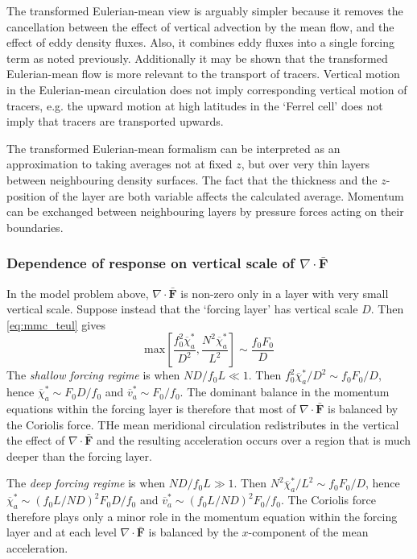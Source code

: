 \documentclass{jknotes}
\begin{document}
The transformed Eulerian-mean view is arguably simpler because it removes the
cancellation between the effect of vertical advection by the mean flow, and
the effect of eddy density fluxes. Also, it combines eddy fluxes into a single
forcing term as noted previously. Additionally it may be shown that the
transformed Eulerian-mean flow is more relevant to the transport of tracers.
Vertical motion in the Eulerian-mean circulation does not imply corresponding
vertical motion of tracers, e.g. the upward motion at high latitudes in the
`Ferrel cell' does not imply that tracers are transported upwards.

The transformed Eulerian-mean formalism can be interpreted as an approximation
to taking averages not at fixed $z$, but over very thin layers between
neighbouring density surfaces. The fact that the thickness and the
$z$-position of the layer are both variable affects the calculated average.
Momentum can be exchanged between neighbouring layers by pressure forces
acting on their boundaries.

\subsubsection{Dependence of response on vertical scale of $\nabla \cdot
\bar{\symbf{F}}$}
In the model problem above, $\nabla \cdot \bar{\symbf{F}}$ is non-zero only in
a layer with very small vertical scale. Suppose instead that the `forcing
layer' has vertical scale $D$. Then \eqref{eq:mmc_teul} gives
\begin{equation}
	\text{max} \left[ \frac{f_0^2 \overline{\chi}_a^*}{D^2}, \frac{N^2
	\overline{\chi}_a^*}{L^2}\right] \sim \frac{f_0 F_0}{D}
\end{equation}
The \emph{shallow forcing regime} is when $ND/f_0 L \ll 1$. Then $f_0^2
\overline{\chi}_a^* / D^2 \sim f_0 F_0/D$, hence $\overline{\chi}_a^* \sim F_0
D/f_0$ and $\overline{v}^*_a \sim F_0/f_0$. The dominant balance in the
momentum equations within the forcing layer is therefore that most of $\nabla
\cdot \bar{\symbf{F}}$ is balanced by the Coriolis force. THe mean meridional
circulation redistributes in the vertical the effect of $\nabla \cdot
\bar{\symbf{F}}$ and the resulting acceleration occurs over a region that is
much deeper than the forcing layer. 

The \emph{deep forcing regime} is when $ND/f_0 L \gg 1$. Then $N^2
\overline{\chi}_a^*/L^2 \sim f_0 F_0/D$, hence $\overline{\chi}_a^* \sim (f_0
L/ND)^2 F_0 D/f_0$ and $\overline{v}_a^* \sim (f_0 L /ND)^2 F_0/f_0$. The
Coriolis force therefore plays only a minor role in the momentum equation
within the forcing layer and at each level $\nabla \cdot \bar{\symbf{F}}$ is
balanced by the $x$-component of the mean acceleration.
\end{document}
